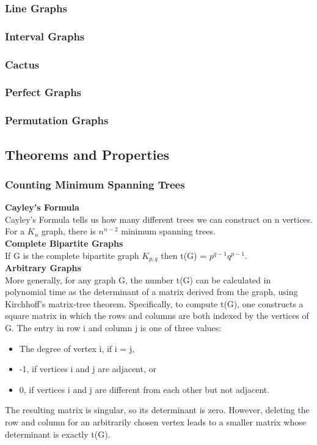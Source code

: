 \documentclass[10pt, twocolumn]{article}
\begin{document}
\begin{flushleft}
\subsubsection{Line Graphs}

\subsubsection{Interval Graphs}

\subsubsection{Cactus}

\subsubsection{Perfect Graphs}

\subsubsection{Permutation Graphs}

\subsection{Theorems and Properties}
\subsubsection{Counting Minimum Spanning Trees}
\textbf{Cayley's Formula}\\
Cayley’s Formula tells us how many different trees we can construct on n vertices.
For a $K_n$ graph, there is $n^{n-2}$ minimum spanning trees.\\[0.2cm]

\textbf{Complete Bipartite Graphs}\\
If G is the complete bipartite graph $K_{p,q}$ then t(G) = $p^{q-1}q^{p-1}$.\\[0.2cm]


\textbf{Arbitrary Graphs}\\
More generally, for any graph G, the number t(G) can be calculated in polynomial time as the determinant of a matrix derived from the graph, using Kirchhoff's matrix-tree theorem. Specifically, to compute t(G), one constructs a square matrix in which the rows and columns are both indexed by the vertices of G. The entry in row i and column j is one of three values:
\begin{itemize}
\item The degree of vertex i, if i = j,
\item -1, if vertices i and j are adjacent, or
\item 0, if vertices i and j are different from each other but not adjacent.
\end{itemize}
The resulting matrix is singular, so its determinant is zero. However, deleting the row and column for an arbitrarily chosen vertex leads to a smaller matrix whose determinant is exactly t(G).\\[0.2cm]


\end{flushleft}
\end{document}
